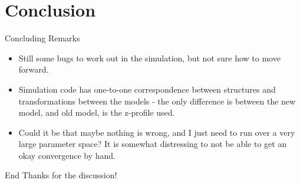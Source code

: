 \section{Conclusion}
\label{ch:Conclusion}

\begin{frame}{Concluding Remarks}
\begin{itemize}
\item Still some bugs to work out in the simulation, but not sure how to move
forward.
\item Simulation code has one-to-one correspondence between structures and
transformations between the models - the only difference is between the new
model, and old model, is the z-profile used.
\item Could it be that maybe nothing is wrong, and I just need to run over a
very large parameter space? It is somewhat distressing to not be able to get an
okay convergence by hand.
\end{itemize}
\end{frame}

\begin{frame}{End}
Thanks for the discussion!
\end{frame}
